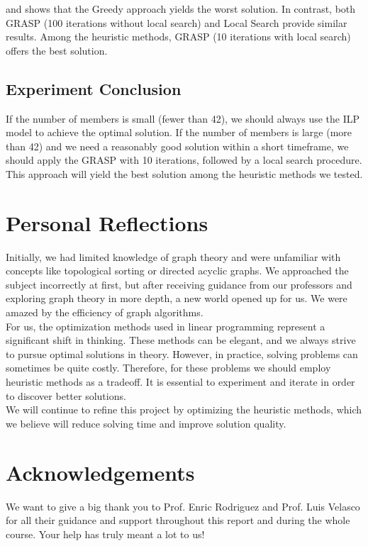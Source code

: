 \documentclass{article}
\begin{document}
 and  shows that the Greedy approach yields the worst solution. In contrast, both GRASP (100 iterations without local search) and Local Search provide similar results. Among the heuristic methods, GRASP (10 iterations with local search) offers the best solution.


\subsection{Experiment Conclusion}

If the number of members is small (fewer than 42), we should always use the ILP model to achieve the optimal solution. If the number of members is large (more than 42) and we need a reasonably good solution within a short timeframe, we should apply the GRASP with 10 iterations, followed by a local search procedure. This approach will yield the best solution among the heuristic methods we tested.

\section{Personal Reflections}

Initially, we had limited knowledge of graph theory and were unfamiliar with concepts like topological sorting or directed acyclic graphs. We approached the subject incorrectly at first, but after receiving guidance from our professors and exploring graph theory in more depth, a new world opened up for us. We were amazed by the efficiency of graph algorithms.\\
For us, the optimization methods used in linear programming represent a significant shift in thinking. These methods can be elegant, and we always strive to pursue optimal solutions in theory. However, in practice, solving problems can sometimes be quite costly. Therefore, for these problems we should employ heuristic methods as a tradeoff. It is essential to experiment and iterate in order to discover better solutions.\\
We will continue to refine this project by optimizing the heuristic methods, which we believe will reduce solving time and improve solution quality.


\section{Acknowledgements}

We want to give a big thank you to Prof. Enric Rodriguez and Prof. Luis Velasco for all their guidance and support throughout this report and during the whole course. Your help has truly meant a lot to us!
\end{document}

